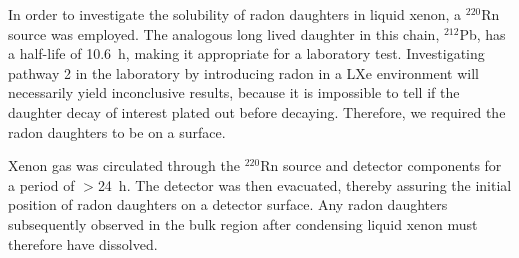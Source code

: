 
In order to investigate the solubility of radon daughters in liquid xenon, a $^{220}$Rn source was employed. The analogous long lived daughter in this chain, $^{212}$Pb, has a half-life of 10.6~h, making it appropriate for a laboratory test. Investigating pathway 2 in the laboratory by introducing radon in a \ac{LXe} environment will necessarily yield inconclusive results, because it is impossible to tell if the daughter decay of interest plated out before decaying. Therefore, we required the radon daughters to be on a surface.

Xenon gas was circulated through the $^{220}$Rn source and detector components for a period of $>$24~h. The detector was then evacuated, thereby assuring the initial position of radon daughters on a detector surface. Any radon daughters subsequently observed in the bulk region after condensing liquid xenon must therefore have dissolved.





